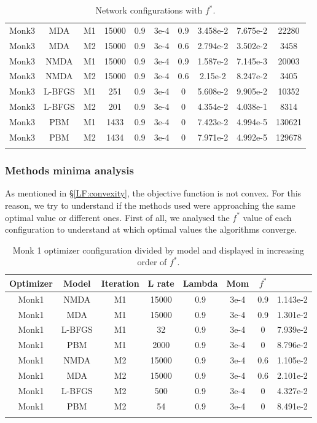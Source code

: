 \begin{center}
\begin{longtable}{|c|c|c|c|c|c|c|c|c|c|}
			Monk3 & MDA & M1 & 15000 & 0.9 & 3e-4  & 0.9 & 3.458e-2 & 7.675e-2 & 22280 \\
			Monk3 & MDA & M2 & 15000 & 0.9 & 3e-4  & 0.6 & 2.794e-2 & 3.502e-2 & 3458 \\
			Monk3 & NMDA & M1 & 15000 & 0.9 & 3e-4  & 0.9 & 1.587e-2 & 7.145e-3 & 20003 \\
			Monk3 & NMDA & M2 & 15000 & 0.9 & 3e-4  & 0.6 & 2.15e-2 & 8.247e-2 & 3405 \\
			Monk3 & L-BFGS & M1 & 251 & 0.9 & 3e-4  & 0 & 5.608e-2 & 9.905e-2 & 10352 \\
			Monk3 & L-BFGS & M2 & 201 & 0.9 & 3e-4  & 0 & 4.354e-2 & 4.038e-1 & 8314 \\
			Monk3 & PBM & M1 & 1433 & 0.9 & 3e-4  & 0 & 7.423e-2 & 4.994e-5 & 130621 \\
			Monk3 & PBM & M2 & 1434 & 0.9 & 3e-4  & 0 & 7.971e-2 & 4.992e-5 & 129678  \\
			\hline
			\caption{Network configurations with $f^*$.}
			\label{tab:nets_res}
		\end{longtable}

\end{center}

\subsubsection{Methods minima analysis} 

As mentioned in \S\ref{LF:convexity}, the objective function is not convex. For this reason, we try to understand if the methods used were approaching the same optimal value or different ones.
First of all, we analysed the $f^{*}$ value of each configuration to understand at which optimal values the algorithms converge. 

\begin{longtable}{|c|c|c|c|c|c|c|c|}
	\hline
	\centering
	\textbf{Optimizer}&\textbf{Model} &\textbf{Iteration} & \textbf{L rate} & \multicolumn{1}{l|}{\textbf{Lambda}} & \textbf{Mom} & \textbf{$f^{*}$} \\ \hline 
	Monk1 & NMDA & M1 & 15000 & 0.9 & 3e-4  & 0.9 & 1.143e-2 	\\
	Monk1 & MDA & M1 & 15000 & 0.9 & 3e-4  & 0.9 & 1.301e-2  		\\
	Monk1 & L-BFGS & M1 & 32 & 0.9 & 3e-4  & 0 &  7.939e-2 			\\
	Monk1 & PBM & M1 & 2000 & 0.9 & 3e-4  & 0 & 8.796e-2  			\\
	Monk1 & NMDA & M2 & 15000 & 0.9 & 3e-4  & 0.6 & 1.105e-2 	\\
	Monk1 & MDA & M2 & 15000 & 0.9 & 3e-4  & 0.6 & 2.101e-2 		\\
	Monk1 & L-BFGS & M2 & 500 & 0.9 & 3e-4  & 0 &   4.327e-2 		\\
	Monk1 & PBM & M2 & 54 & 0.9 & 3e-4  & 0 & 8.491e-2 				\\
	\hline
	\caption{Monk 1 optimizer configuration divided by model and displayed in increasing order of $f^*$.}
	\label{tab:nets_res_plots_Monk1}
\end{longtable}


